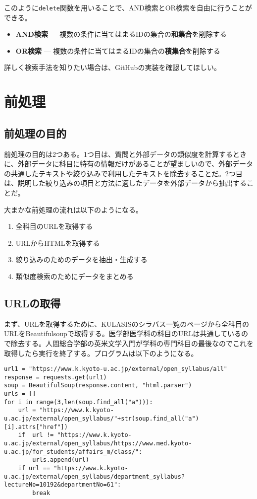 このように\texttt{delete}関数を用いることで、AND検索とOR検索を自由に行うことができる。

\begin{itemize}
  \item \textbf{AND検索} --- 複数の条件に当てはまるIDの集合の\textbf{和集合}を削除する
  \item \textbf{OR検索} --- 複数の条件に当てはまるIDの集合の\textbf{積集合}を削除する
\end{itemize}

詳しく検索手法を知りたい場合は、GitHubの実装を確認してほしい。

\section{前処理}
\subsection{前処理の目的}
前処理の目的は2つある。1つ目は、質問と外部データの類似度を計算するときに、外部データに科目に特有の情報だけがあることが望ましいので、外部データの共通したテキストや絞り込みで利用したテキストを除去することだ。2つ目は、説明した絞り込みの項目と方法に適したデータを外部データから抽出することだ。

大まかな前処理の流れは以下のようになる。
\begin{enumerate}
  \item 全科目のURLを取得する
  \item URLからHTMLを取得する
  \item 絞り込みのためのデータを抽出・生成する
  \item 類似度検索のためにデータをまとめる
\end{enumerate}

\subsection{URLの取得}
まず、URLを取得するために、KULASISのシラバス一覧のページから全科目のURLをBeautifulsoupで取得する。医学部医学科の科目のURLは共通しているので除去する。人間総合学部の英米文学入門が学科の専門科目の最後なのでこれを取得したら実行を終了する。プログラムは以下のようになる。

\begin{lstlisting}[caption=URLの取得]
url1 = "https://www.k.kyoto-u.ac.jp/external/open_syllabus/all"
response = requests.get(url1)
soup = BeautifulSoup(response.content, "html.parser")
urls = []
for i in range(3,len(soup.find_all("a"))):
    url = "https://www.k.kyoto-u.ac.jp/external/open_syllabus/"+str(soup.find_all("a")[i].attrs["href"])
    if  url != "https://www.k.kyoto-u.ac.jp/external/open_syllabus/https://www.med.kyoto-u.ac.jp/for_students/affairs_m/class/":
        urls.append(url)
    if url == "https://www.k.kyoto-u.ac.jp/external/open_syllabus/department_syllabus?lectureNo=10192&departmentNo=61":
        break
\end{lstlisting}

